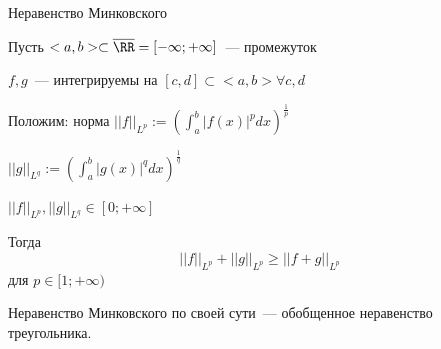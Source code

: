 \begin{Theorem}{Неравенство Минковского}{}

    Пусть $<a, b> \subset \overline{\RR} = [-\infty; +\infty]$~--- промежуток

    $f, g$~--- интегрируемы на $[c, d] \subset <a, b> \forall c, d$

    Положим: норма $||f||_{L^p} := \left( \int^b_a |f(x)|^p dx \right)^{\frac{1}{p}}$

    $||g||_{L^q} := \left( \int^b_a |g(x)|^q dx \right)^{\frac{1}{q}}$

    $||f||_{L^p} , ||g||_{L^q} \in [0; +\infty]$

    Тогда \[ ||f||_{L^p} + ||g||_{L^p} \ge ||f + g||_{L^p} \]
    для $p \in [1; +\infty)$

\end{Theorem}
Неравенство Минковского по своей сути~--- обобщенное неравенство треугольника.
